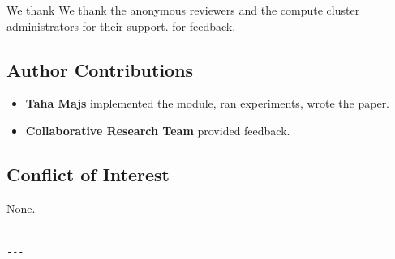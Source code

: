 We thank We thank the anonymous reviewers and the compute cluster administrators for their support. for feedback.

\subsection{Author Contributions}

\begin{itemize}
\item \textbf{Taha Majs} implemented the module, ran experiments, wrote the paper.
\item \textbf{Collaborative Research Team} provided feedback.

\end{itemize}
\subsection{Conflict of Interest}

None.
\begin{lstlisting}

---
\end{lstlisting}